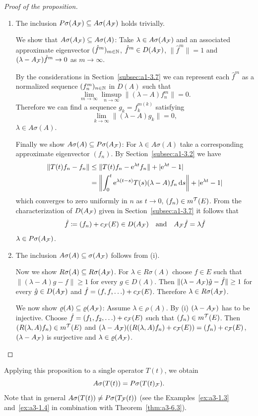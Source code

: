 \begin{proof}[Proof of the proposition]
\begin{enumerate}[\upshape (i), wide, labelindent=.25em]
\item 
The inclusion $P\sigma(A_{\mathcal{F}}) \subseteq A\sigma(A_{\mathcal{F}})$ holds trivially.

We show that $A\sigma(A_{\mathcal{F}}) \subseteq A\sigma(A)$: Take $\lambda \in A\sigma(A_{\mathcal{F}})$ and an associated approximate eigenvector $(\hat{f}^{m})_{m \in \mathbb{N}}$, \ie $\hat{f}^{m} \in D(A_{\mathcal{F}})$, $\|\hat{f}^{m}\| = 1$ and $(\lambda-A_{\mathcal{F}})\hat{f}^{m} \to 0$ as $m \to \infty$.

By the considerations in Section~\ref{subsec:a1-3.7} we can represent each $\hat{f}^{m}$ as a normalized sequence $(f_{n}^{m})_{n \in \mathbb{N}}$ in $D(A)$ such that
\[
\lim_{m \to \infty} \limsup_{n \to \infty} \|(\lambda-A)f_{n}^{m}\| = 0 .
\]
Therefore we can find a sequence $g_{k} = f_{k}^{m(k)}$ satisfying
\[
\lim_{k \to \infty} \|(\lambda-A)g_{k}\| = 0 ,
\]
\ie $\lambda \in A\sigma(A)$.

Finally we show $A\sigma(A) \subseteq P\sigma(A_{\mathcal{F}})$: For $\lambda \in A\sigma(A)$ take a corresponding approximate eigenvector $(f_{n})$.
By Section~\ref{subsec:a1-3.2} we have
\begin{align*}
\|T(t)f_{n} - f_{n}\| &\leq \|T(t)f_{n} - \eu^{\lambda t}f_{n}\| + |\eu^{\lambda t} - 1| \\
&= \left\|\int_{0}^{t} \eu^{\lambda(t-s)}T(s)(\lambda-A)f_{n} \ds\right\| + |\eu^{\lambda t} - 1|
\end{align*}
which converges to zero uniformly in $n$ as $t \to 0$, \ie $(f_{n}) \in m^{\mathcal{T}}(E)$.
From the characterization of\/ $D(A_{\mathcal{F}})$ given in Section~\ref{subsec:a1-3.7} it follows that
\[
	\hat{f} \coloneq (f_{n}) + c_{\mathcal{F}}(E) \in D(A_{\mathcal{F}})
	\quad \text{and} \quad
	A_{\mathcal{F}}\hat{f} = \lambda\hat{f}
\]
\ie  $\lambda \in P\sigma(A_{\mathcal{F}}) $.

\item 
The inclusion $A\sigma(A) \subseteq \sigma(A_{\mathcal{F}})$ follows from (i). 

Now we show $R\sigma(A) \subseteq R\sigma(A_{\mathcal{F}})$.
For $\lambda \in R\sigma(A)$ choose $f \in E$ such that $\|(\lambda-A)g - f\| \geq 1$ for every $g \in D(A)$.
Then $\|(\lambda-A_{\F})\hat{g} - \hat{f}\| \geq 1$ for every $\hat{g} \in D(A_{\mathcal{F}})$ and $\hat{f} = (f,f,\ldots) + c_{\mathcal{F}}(E)$.
Therefore $\lambda \in R\sigma(A_{\mathcal{F}})$.

We now show $\rho(A) \subseteq \rho(A_{\F})$: Assume $\lambda \in \rho(A)$.
By (i) $(\lambda-A_{\mathcal{F}})$ has to be injective.
Choose $\hat{f} = (f_{1},f_{2},\ldots) + c_{\mathcal{F}}(E)$ such that $(f_{n}) \in m^{\mathcal{T}}(E)$.
Then $(R(\lambda,A)f_{n}) \in m^{\mathcal{T}}(E)$ and $(\lambda-A_{\mathcal{F}})((R(\lambda,A)f_{n})+c_{\mathcal{F}}(E)) = (f_{n}) + c_{\mathcal{F}}(E)$, \ie $(\lambda-A_{\mathcal{F}})$ is surjective and $\lambda \in \rho(A_{\F})$.
\qedhere
\end{enumerate}
\end{proof}
Applying this proposition to a single operator $T(t)$, we obtain
\[
A\sigma(T(t)) = P\sigma(T(t)_{\mathcal{F}}) .
\]
Note that in general $A\sigma(T(t)) \neq P\sigma(T_{\mathcal{F}}(t))$ (see the Examples~\ref{ex:a3-1.3} and~\ref{ex:a3-1.4} in combination with Theorem~\ref{thm:a3-6.3}).
